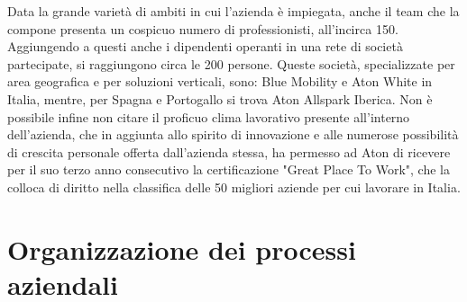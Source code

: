 Data la grande varietà di ambiti in cui l'azienda è impiegata, anche il team che la compone presenta un cospicuo numero di professionisti, all'incirca 150. 
Aggiungendo a questi anche i dipendenti operanti in una rete di società partecipate, si raggiungono circa le 200 persone. 
Queste società, specializzate per area geografica e per soluzioni verticali, sono: Blue Mobility e Aton White in Italia,
mentre, per Spagna e Portogallo si trova Aton Allspark Iberica.
Non è possibile infine non citare il proficuo clima lavorativo presente all'interno dell'azienda, che in aggiunta allo spirito di innovazione e alle numerose possibilità di crescita personale
offerta dall'azienda stessa, ha permesso ad Aton di ricevere per il suo terzo anno consecutivo la certificazione "Great Place To Work", che la colloca di diritto
nella classifica delle 50 migliori aziende per cui lavorare in Italia.



\section{Organizzazione dei processi aziendali}


